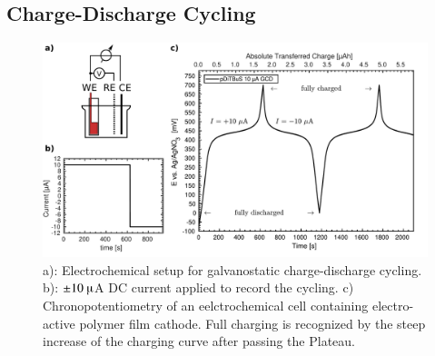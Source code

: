 \subsection{Charge-Discharge Cycling}
\label{sec:echem_charging}
\begin{figure}[h]
\center
	\includegraphics[width=1\textwidth]{./electrochemistry/figures/GCD_principle_pDiTBuS.pdf}
	\caption{a): Electrochemical setup for galvanostatic charge-discharge cycling. b): $\pm10~\muup$A DC current applied to record the cycling. c) Chronopotentiometry of an eelctrochemical cell containing electro-active polymer film cathode. Full charging is recognized by the steep increase of the charging curve after passing the Plateau.}
	\label{fig:GCD}
\end{figure}

